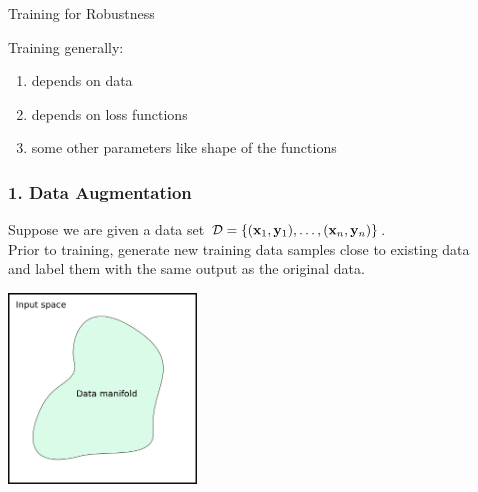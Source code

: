 \documentclass[aspectratio=169]{beamer}
\begin{document}
\begin{frame}
  \frametitle{}



  \begin{block}{ Training for Robustness}

    \end{block}

    \pause
    Training generally:

    \begin{enumerate}
    \item depends on data
    \item depends on loss functions
      \item some other parameters like shape of the functions
      \end{enumerate}
    
\end{frame}





\begin{frame}[fragile]
  \frametitle{1. Data Augmentation}
  Suppose we are given a data set $\mathcal{D} =  \{(\mathbf{x}_1, \mathbf{y}_1), \ldots , (\mathbf{x}_n, \mathbf{y}_n)\}$. \\
  Prior to training, generate new training data samples close to existing data\\ and label them with the same output as the original data.
      {\scriptsize
 \begin{thebibliography}{99}
   \beamertemplatearticlebibitems
\end{thebibliography}}

\pause

\begin{center}

  \includegraphics[width=5cm]{Images/SR-vs-CR-1.png}

  \end{center}
  
\end{frame}
\end{document}
